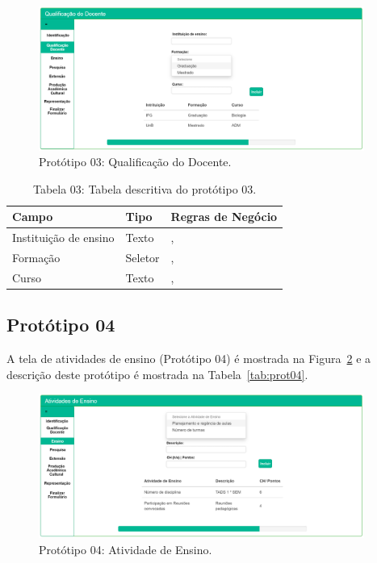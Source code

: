 \begin{figure}[H]
    \centering
    \includegraphics[width=0.95\textwidth]{img/3pagina_qualificacao_do_docente.png}
    \caption[Protótipo 03: Qualificação do Docente]{Protótipo 03: Qualificação do Docente.}
    \label{fig:prot03}
\end{figure}


\begin{table}[H]
\centering
\caption[Tabela 03: Tabela descritiva do protótipo 03.]{Tabela 03: Tabela descritiva do protótipo 03.}
\label{tab:prot03}
\begin{tabular}{@{}lll@{}}
\toprule
Campo                   & Tipo     &  Regras de Negócio                     \\ \midrule
Instituição de ensino   & Texto    &    \nameref{rn005}, \nameref{rn006}    \\
Formação                & Seletor  &    \nameref{rn005}, \nameref{rn006}    \\
Curso                   & Texto    &    \nameref{rn005}, \nameref{rn006}    \\ \bottomrule
\end{tabular}
\end{table}

\newpage
\subsection{Protótipo 04}\label{prototipo04}
A tela de atividades de ensino (Protótipo 04) é mostrada na Figura~\ref{fig:prot04} e a descrição deste protótipo é mostrada na Tabela~\ref{tab:prot04}.

\begin{figure}[H]
    \centering
    \includegraphics[width=0.95\textwidth]{img/4pagina_atividades_de_ensino.png}
    \caption[Protótipo 04: Atividade de Ensino]{Protótipo 04: Atividade de Ensino.}
    \label{fig:prot04}
\end{figure}

